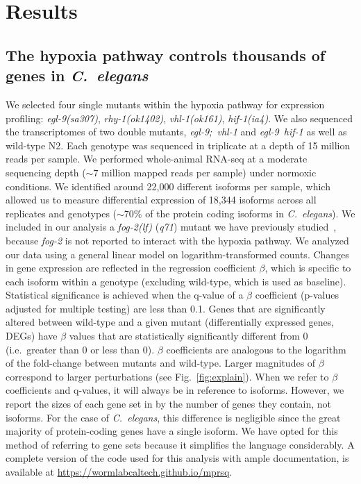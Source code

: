 \documentclass[9pt,twocolumn,twoside]{pnas-new}
\newcommand{\cel}{\emph{C.~elegans}}
\newcommand{\gene}[1]{\mbox{\emph{#1}}}
\newcommand{\fog}{\gene{fog-2(lf)}}
\begin{document}
\section*{Results}
\subsection*{The hypoxia pathway controls thousands of genes in \cel{}}
\label{sub:summary}

We selected four single mutants within the hypoxia pathway for expression
profiling: \gene{egl-9}\emph{(sa307)}, \gene{rhy-1}\emph{(ok1402)},
\gene{vhl-1}\emph{(ok161)}, \gene{hif-1}\emph{(ia4)}. We also sequenced the
transcriptomes of two double mutants, \gene{egl-9; vhl-1} and \gene{egl-9 hif-1}
as well as wild-type N2. Each genotype  was sequenced in triplicate at a depth
of 15 million reads per sample. We performed whole-animal RNA-seq at a moderate sequencing
depth ($\sim7$ million mapped reads per sample) under normoxic conditions.
We identified around 22,000 different isoforms per sample, which allowed us to
measure differential expression of 18,344 isoforms across all replicates and
genotypes ($\sim$70\% of the protein coding isoforms in \cel{}). We included in
our analysis a \fog{} (\emph{q71}) mutant we have previously
studied~\cite{Angeles-Albores2016a}, because \gene{fog-2} is not reported to
interact with the hypoxia pathway. We analyzed our data using a general linear
model on logarithm-transformed counts. Changes in gene expression are reflected
in the regression coefficient $\beta$, which is specific to each isoform within
a genotype (excluding wild-type, which is used as baseline). Statistical
significance is achieved when the q-value of a $\beta$ coefficient (p-values
adjusted for multiple testing) are less than 0.1. Genes that are significantly
altered between wild-type and a given mutant (differentially expressed genes,
DEGs) have $\beta$ values that are statistically significantly different from 0
(i.e.\ greater than 0 or less than 0). $\beta$ coefficients are analogous to the
logarithm of the fold-change between mutants and wild-type. Larger magnitudes of
$\beta$ correspond to larger perturbations (see Fig.~\ref{fig:explain}). When we
refer to $\beta$ coefficients and q-values, it will always be in reference to
isoforms. However, we report the sizes of each gene set in by the number of
genes they contain, not isoforms. For the case of \cel{}, this difference is
negligible since the great majority of protein-coding genes have a single
isoform. We have opted for this method of referring to gene sets because it
simplifies the language considerably. A complete version of the code used for
this analysis with ample documentation, is available at
\url{https://wormlabcaltech.github.io/mprsq}.
\end{document}
